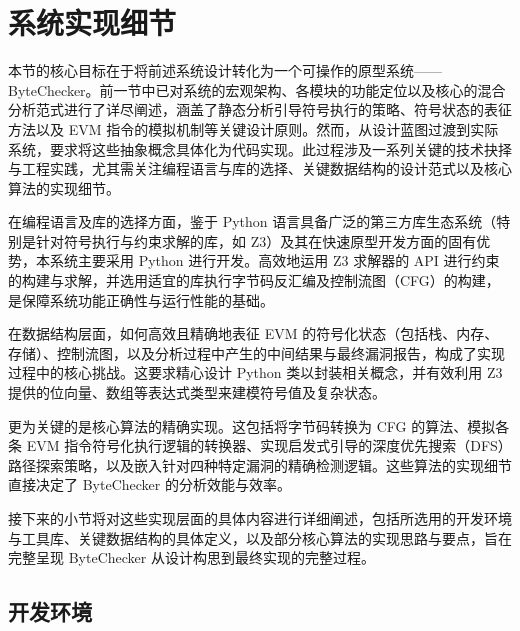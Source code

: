 \documentclass[print, master, vlined, timesmath]{DissertUESTC}
\begin{document}


\section{系统实现细节}

本节的核心目标在于将前述系统设计转化为一个可操作的原型系统——ByteChecker。前一节中已对系统的宏观架构、各模块的功能定位以及核心的混合分析范式进行了详尽阐述，涵盖了静态分析引导符号执行的策略、符号状态的表征方法以及 EVM 指令的模拟机制等关键设计原则。然而，从设计蓝图过渡到实际系统，要求将这些抽象概念具体化为代码实现。此过程涉及一系列关键的技术抉择与工程实践，尤其需关注编程语言与库的选择、关键数据结构的设计范式以及核心算法的实现细节。

在编程语言及库的选择方面，鉴于 Python 语言具备广泛的第三方库生态系统（特别是针对符号执行与约束求解的库，如 Z3）及其在快速原型开发方面的固有优势，本系统主要采用 Python 进行开发。高效地运用 Z3 求解器的 API 进行约束的构建与求解，并选用适宜的库执行字节码反汇编及控制流图（CFG）的构建，是保障系统功能正确性与运行性能的基础。

在数据结构层面，如何高效且精确地表征 EVM 的符号化状态（包括栈、内存、存储）、控制流图，以及分析过程中产生的中间结果与最终漏洞报告，构成了实现过程中的核心挑战。这要求精心设计 Python 类以封装相关概念，并有效利用 Z3 提供的位向量、数组等表达式类型来建模符号值及复杂状态。

更为关键的是核心算法的精确实现。这包括将字节码转换为 CFG 的算法、模拟各条 EVM 指令符号化执行逻辑的转换器、实现启发式引导的深度优先搜索（DFS）路径探索策略，以及嵌入针对四种特定漏洞的精确检测逻辑。这些算法的实现细节直接决定了 ByteChecker 的分析效能与效率。

接下来的小节将对这些实现层面的具体内容进行详细阐述，包括所选用的开发环境与工具库、关键数据结构的具体定义，以及部分核心算法的实现思路与要点，旨在完整呈现 ByteChecker 从设计构思到最终实现的完整过程。

\subsection{开发环境}
\end{document}
